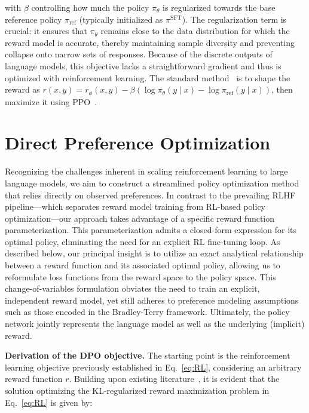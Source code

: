 with $\beta$ controlling how much the policy $\pi_{\theta}$ is regularized towards the base reference policy $\pi_\text{ref}$ (typically initialized as $\pi^\text{SFT}$). The regularization term is crucial: it ensures that $\pi_\theta$ remains close to the data distribution for which the reward model is accurate, thereby maintaining sample diversity and preventing collapse onto narrow sets of responses. Because of the discrete outputs of language models, this objective lacks a straightforward gradient and thus is optimized with reinforcement learning. The standard method~\citep{ziegler2020finetuning, stiennon2022learning, bai2022training, ouyang2022training} is to shape the reward as ${r(x, y) = r_{\phi}(x, y) -\beta (\log \pi_{\theta}(y\mid x) - \log \pi_\text{ref}(y\mid x))}$, then maximize it using PPO~\cite{schulman2017proximal}.

\section{Direct Preference Optimization}\label{sec:DPO}

Recognizing the challenges inherent in scaling reinforcement learning to large language models, we aim to construct a streamlined policy optimization method that relies directly on observed preferences. In contrast to the prevailing RLHF pipeline—which separates reward model training from RL-based policy optimization—our approach takes advantage of a specific reward function parameterization. This parameterization admits a closed-form expression for its optimal policy, eliminating the need for an explicit RL fine-tuning loop. As described below, our principal insight is to utilize an exact analytical relationship between a reward function and its associated optimal policy, allowing us to reformulate loss functions from the reward space to the policy space. This change-of-variables formulation obviates the need to train an explicit, independent reward model, yet still adheres to preference modeling assumptions such as those encoded in the Bradley-Terry framework. Ultimately, the policy network jointly represents the language model as well as the underlying (implicit) reward.

\textbf{Derivation of the DPO objective.} The starting point is the reinforcement learning objective previously established in Eq.~\ref{eq:RL}, considering an arbitrary reward function $r$. Building upon existing literature~\citep{peters2007reinforcement, peng2019advantage, korbak2022reinforcement, go2023aligning}, it is evident that the solution optimizing the KL-regularized reward maximization problem in Eq.~\ref{eq:RL} is given by:


